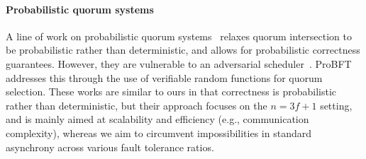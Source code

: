 \paragraph{Probabilistic quorum systems}
A line of work on probabilistic quorum systems~\cite{prob-quorums, Yu06} relaxes quorum  intersection to be probabilistic rather than deterministic, and allows for probabilistic correctness guarantees. However, they are vulnerable to an adversarial scheduler~\cite{AiyerAB05}. ProBFT~\cite{probft} addresses this through the use of verifiable random functions for quorum selection. These works are similar to ours in that correctness is probabilistic rather than deterministic, but their approach focuses on the $n=3f+1$ setting, and is mainly aimed at scalability and efficiency (e.g., communication complexity), whereas we aim to circumvent impossibilities in standard asynchrony across various fault tolerance ratios.




